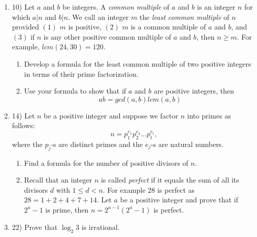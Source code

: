 \documentclass[11pt]{preprint}
\def\enumb{\begin{enumerate}}
\def\enume{\end{enumerate}}
\begin{document}
\enumb
\item[10)] Let $a$ and $b$ be integers. A \textit{common multiple} of $a$ and $b$ is an integer $n$ for which $a|n$ and $b|n$. We call an integer $m$ the \textit{least common multiple} of $n$ provided $(1)$ $m$ is positive, $(2)$ $m$ is a common multiple of $a$ and $b$, and $(3)$ if $n$ is any other positive common multiple of $a$ and $b$, then $n\geq m$. For example, $lcm(24,30)=120$.
\enumb
\item Develop a formula for the least common multiple of two positive integers in terms of their prime factorization.
\item Use your formula to show that if $a$ and $b$ are positive integers, then
\[
ab=gcd(a,b)lcm(a,b)
\]
\enume
\item[14)] Let $n$ be a positive integer and suppose we factor $n$ into primes as follows:
\[
n=p_1^{e_1}p_2^{e_2}\dots p_t^{e_t},
\]
where the $p_j$-s are distinct primes and the $e_j$-s are natural numbers. 
\enumb
\item Find a formula for the number of positive divisors of $n$.
\item Recall that an integer $n$ is called \textit{perfect} if it equals the sum of all its divisors $d$ with $1\leq d<n$. For example $28$ is perfect as $28=1+2+4+7+14$. Let $a$ be a positive integer and prove that if $2^a-1$ is prime, then $n=2^{a-1}(2^a-1)$ is perfect.
\enume
\item[22)] Prove that $\log_2 3$ is irrational.
\enume
\end{document}
